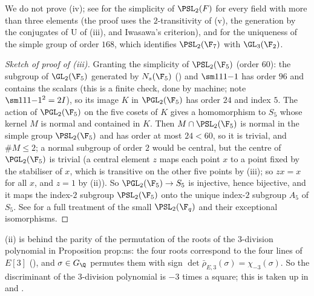 We do not prove (iv); see \cite[Chapter XIII, Section 8]{Lang} for the simplicity of $\PSL_2(F)$ for every field with more than three elements
(the proof uses the $2$-transitivity of (v), the generation by the conjugates of $\mathrm U$ of (iii), and Iwasawa's
criterion), and \cite[Section 6.2]{DummitFoote} for the uniqueness of the simple group of order $168$, which identifies $\PSL_2(\F_7)$ with $\GL_3(\F_2)$.

\begin{proof}[Sketch of proof of (iii)]
Granting the simplicity of $\PSL_2(\F_5)$ (order $60$): the subgroup of $\GL_2(\F_5)$ generated by $N_s(\F_5)$ () and $\sm111{-1}$ has order
$96$ and contains the scalars (this is a finite check, done by machine; note $\sm111{-1}^2=2I$), so its image $K$ in $\PGL_2(\F_5)$ has order $24$ and index $5$. The
action of $\PGL_2(\F_5)$ on the five cosets of $K$ gives a homomorphism to $S_5$ whose kernel $M$ is normal and contained in $K$. Then $M\cap\PSL_2(\F_5)$ is normal in
the simple group $\PSL_2(\F_5)$ and has order at most $24<60$, so it is trivial, and $\#M\le2$; a normal subgroup of order $2$ would be central, but the centre of
$\PGL_2(\F_5)$ is trivial (a central element $z$ maps each point $x$ to a point fixed by the stabiliser of $x$, which is transitive on the other five points by
(iii); so $zx=x$ for all $x$, and $z=1$ by (ii)). So $\PGL_2(\F_5)\to S_5$ is injective, hence bijective, and it maps the index-$2$ subgroup $\PSL_2(\F_5)$ onto the unique index-$2$
subgroup $A_5$ of $S_5$. See \cite[Chapter II, Section 8]{Huppert67} for a full treatment of the small $\PSL_2(\F_q)$ and their exceptional isomorphisms.
\end{proof}

\begin{paperlink}
(ii) is behind the parity of the permutation of the roots of the $3$-division polynomial in Proposition prop:ns: the four roots correspond
to the four lines of $E[3]$ (), and $\sigma\in G_\Q$ permutes them with sign $\det\bar\rho_{E,3}(\sigma)=\chi_{-3}(\sigma)$. So the discriminant of the
$3$-division polynomial is $-3$ times a square; this is taken up in  and .
\end{paperlink}

